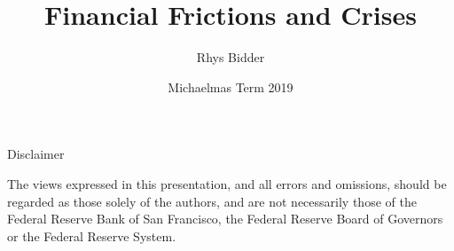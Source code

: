 \documentclass{beamer}
\begin{document}
\title[Financial Frictions and Crises]{Financial Frictions and Crises}
\author[Bidder]{Rhys Bidder}
\date{Michaelmas Term 2019}
\maketitle


\begin{frame}{Disclaimer}

The views expressed in this presentation, and all errors and omissions, should be regarded as those solely of the authors, and are not necessarily those of the Federal Reserve Bank of San Francisco, the Federal Reserve Board of Governors or the Federal Reserve System.

\end{frame}









%
\end{document}
